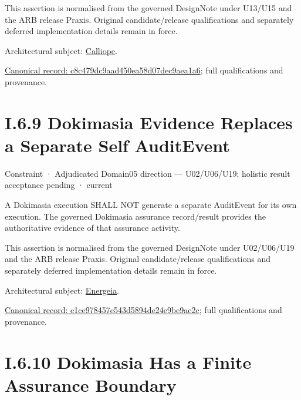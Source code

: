 This assertion is normalised from the governed DesignNote under U13/U15 and the ARB release Praxis. Original candidate/release qualifications and separately deferred implementation details remain in force.



Architectural subject: \hyperref[element:466ad8f75a954c0581b5bba090443849]{Calliope}.


{\footnotesize \href{../../../../../../../../continuum/motivation/constraint/c8c479dc9aad450ea58d07dec9aea1a6.md}{Canonical record: c8c479dc9aad450ea58d07dec9aea1a6}; full qualifications and provenance.}\par
\section*{I.6.9 Dokimasia Evidence Replaces a Separate Self AuditEvent}
\label{navigation:I.6.9}

\label{element:e1ce978457e543d5894de24e9be9ac2c}
{\small Constraint · Adjudicated Domain05 direction — U02/U06/U19; holistic result acceptance pending · current}\par

A Dokimasia execution SHALL NOT generate a separate AuditEvent for its own execution. The governed Dokimasia assurance record/result provides the authoritative evidence of that assurance activity.



This assertion is normalised from the governed DesignNote under U02/U06/U19 and the ARB release Praxis. Original candidate/release qualifications and separately deferred implementation details remain in force.



Architectural subject: \hyperref[element:fb3f37a6ac614415ac486a6de9d35994]{Energeia}.


{\footnotesize \href{../../../../../../../../continuum/motivation/constraint/e1ce978457e543d5894de24e9be9ac2c.md}{Canonical record: e1ce978457e543d5894de24e9be9ac2c}; full qualifications and provenance.}\par
\section*{I.6.10 Dokimasia Has a Finite Assurance Boundary}
\label{navigation:I.6.10}

